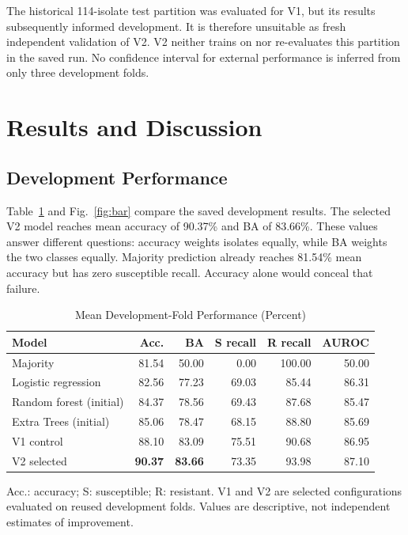 \documentclass[conference]{IEEEtran}
\begin{document}
The historical 114-isolate test partition was evaluated for V1, but its results subsequently informed development. It is therefore unsuitable as fresh independent validation of V2. V2 neither trains on nor re-evaluates this partition in the saved run. No confidence interval for external performance is inferred from only three development folds.

\section{Results and Discussion}
\subsection{Development Performance}
Table~\ref{tab:models} and Fig.~\ref{fig:bar} compare the saved development results. The selected V2 model reaches mean accuracy of 90.37\% and BA of 83.66\%. These values answer different questions: accuracy weights isolates equally, while BA weights the two classes equally. Majority prediction already reaches 81.54\% mean accuracy but has zero susceptible recall. Accuracy alone would conceal that failure.

\begin{table}[t]
\caption{Mean Development-Fold Performance (Percent)}
\label{tab:models}
\centering\footnotesize
\setlength{\tabcolsep}{3pt}
\begin{tabular}{lrrrrr}\toprule
Model & Acc. & BA & S recall & R recall & AUROC\\\midrule
Majority &81.54&50.00&0.00&100.00&50.00\\
Logistic regression &82.56&77.23&69.03&85.44&86.31\\
Random forest (initial)&84.37&78.56&69.43&87.68&85.47\\
Extra Trees (initial)&85.06&78.47&68.15&88.80&85.69\\
V1 control &88.10&83.09&75.51&90.68&86.95\\
V2 selected &\textbf{90.37}&\textbf{83.66}&73.35&93.98&87.10\\\bottomrule
\end{tabular}
\vspace{3pt}
\parbox{\columnwidth}{\footnotesize Acc.: accuracy; S: susceptible; R: resistant. V1 and V2 are selected configurations evaluated on reused development folds. Values are descriptive, not independent estimates of improvement.}
\end{table}
\end{document}
